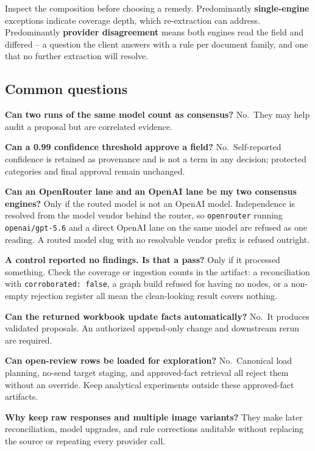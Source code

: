 \documentclass[
]{article}
\begin{document}
Inspect the composition before choosing a remedy. Predominantly
\textbf{single-engine} exceptions indicate coverage depth, which
re-extraction can address. Predominantly \textbf{provider disagreement}
means both engines read the field and differed -- a question the client
answers with a rule per document family, and one that no further
extraction will resolve.

\subsection{Common questions}\label{common-questions}

\textbf{Can two runs of the same model count as consensus?} No.~They may
help audit a proposal but are correlated evidence.

\textbf{Can a 0.99 confidence threshold approve a field?}
No.~Self-reported confidence is retained as provenance and is not a term
in any decision; protected categories and final approval remain
unchanged.

\textbf{Can an OpenRouter lane and an OpenAI lane be my two consensus
engines?} Only if the routed model is not an OpenAI model. Independence
is resolved from the model vendor behind the router, so
\texttt{openrouter} running
\texttt{openai/\allowbreak{}gpt-\allowbreak{}5.6} and a direct OpenAI
lane on the same model are refused as one reading. A routed model slug
with no resolvable vendor prefix is refused outright.

\textbf{A control reported no findings. Is that a pass?} Only if it
processed something. Check the coverage or ingestion counts in the
artifact: a reconciliation with \texttt{corroborated:\ false}, a graph
build refused for having no nodes, or a non-empty rejection register all
mean the clean-looking result covers nothing.

\textbf{Can the returned workbook update facts automatically?} No.~It
produces validated proposals. An authorized append-only change and
downstream rerun are required.

\textbf{Can open-review rows be loaded for exploration?} No.~Canonical
load planning, no-send target staging, and approved-fact retrieval all
reject them without an override. Keep analytical experiments outside
these approved-fact artifacts.

\textbf{Why keep raw responses and multiple image variants?} They make
later reconciliation, model upgrades, and rule corrections auditable
without replacing the source or repeating every provider call.
\end{document}
